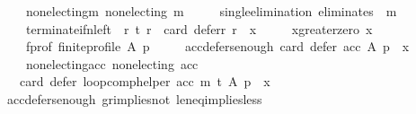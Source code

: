 \begin{isabellebody}
\ \ \ \ non{\isacharunderscore}{\kern0pt}electing{\isacharunderscore}{\kern0pt}m{\isacharcolon}{\kern0pt}\ {\isachardoublequoteopen}non{\isacharunderscore}{\kern0pt}electing\ m{\isachardoublequoteclose}\ \isanewline
\ \ \ \ single{\isacharunderscore}{\kern0pt}elimination{\isacharcolon}{\kern0pt}\ {\isachardoublequoteopen}eliminates\ {}\ m{\isachardoublequoteclose}\ \isanewline
\ \ \ \ terminate{\isacharunderscore}{\kern0pt}if{\isacharunderscore}{\kern0pt}n{\isacharunderscore}{\kern0pt}left{\isacharcolon}{\kern0pt}\ {\isachardoublequoteopen}{\isasymforall}\ r{\isachardot}{\kern0pt}\ {\isacharparenleft}{\kern0pt}{\isacharparenleft}{\kern0pt}t\ r{\isacharparenright}{\kern0pt}\ {\isasymlongleftrightarrow}\ {\isacharparenleft}{\kern0pt}card\ {\isacharparenleft}{\kern0pt}defer{\isacharunderscore}{\kern0pt}r\ r{\isacharparenright}{\kern0pt}\ {\isacharequal}{\kern0pt}\ x{\isacharparenright}{\kern0pt}{\isacharparenright}{\kern0pt}{\isachardoublequoteclose}\ \isanewline
\ \ \ \ x{\isacharunderscore}{\kern0pt}greater{\isacharunderscore}{\kern0pt}zero{\isacharcolon}{\kern0pt}\ {\isachardoublequoteopen}x\ {\isachargreater}{\kern0pt}\ {}{\isachardoublequoteclose}\ \isanewline
\ \ \ \ f{\isacharunderscore}{\kern0pt}prof{\isacharcolon}{\kern0pt}\ {\isachardoublequoteopen}finite{\isacharunderscore}{\kern0pt}profile\ A\ p{\isachardoublequoteclose}\ \isanewline
\ \ \ \ acc{\isacharunderscore}{\kern0pt}defers{\isacharunderscore}{\kern0pt}enough{\isacharcolon}{\kern0pt}\ {\isachardoublequoteopen}card\ {\isacharparenleft}{\kern0pt}defer\ acc\ A\ p{\isacharparenright}{\kern0pt}\ {\isasymge}\ x{\isachardoublequoteclose}\ \isanewline
\ \ \ \ non{\isacharunderscore}{\kern0pt}electing{\isacharunderscore}{\kern0pt}acc{\isacharcolon}{\kern0pt}\ {\isachardoublequoteopen}non{\isacharunderscore}{\kern0pt}electing\ acc{\isachardoublequoteclose}\isanewline
\ \ \ {\isachardoublequoteopen}card\ {\isacharparenleft}{\kern0pt}defer\ {\isacharparenleft}{\kern0pt}loop{\isacharunderscore}{\kern0pt}comp{\isacharunderscore}{\kern0pt}helper\ acc\ m\ t{\isacharparenright}{\kern0pt}\ A\ p{\isacharparenright}{\kern0pt}\ {\isacharequal}{\kern0pt}\ x{\isachardoublequoteclose}\isanewline
%
\isadelimproof
\ \ %
\endisadelimproof
%
\isatagproof
{}\isamarkupfalse%
\ acc{\isacharunderscore}{\kern0pt}defers{\isacharunderscore}{\kern0pt}enough\ gr{\isacharunderscore}{\kern0pt}implies{\isacharunderscore}{\kern0pt}not{}\ le{\isacharunderscore}{\kern0pt}neq{\isacharunderscore}{\kern0pt}implies{\isacharunderscore}{\kern0pt}less\isanewline

\end{isabellebody}
